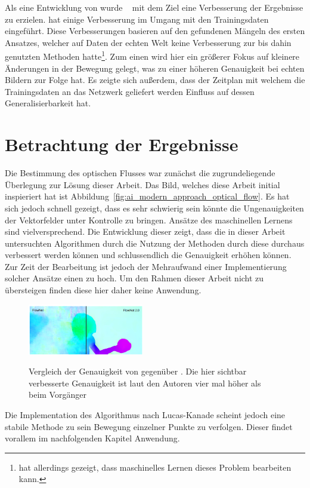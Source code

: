 Als eine Entwicklung von  wurde ~\cite{Ilg2016} mit dem Ziel eine Verbesserung der Ergebnisse zu erzielen.
 hat einige Verbesserung im Umgang mit den Trainingsdaten eingeführt.
Diese Verbesserungen basieren auf den gefundenen Mängeln des ersten Ansatzes, welcher auf Daten der echten Welt keine Verbesserung zur bis dahin genutzten Methoden hatte\footnote{ hat allerdings gezeigt, dass maschinelles Lernen dieses Problem bearbeiten kann.}.
Zum einen wird hier ein größerer Fokus auf kleinere Änderungen in der Bewegung gelegt, was zu einer höheren Genauigkeit bei echten Bildern zur Folge hat.
Es zeigte sich außerdem, dass der Zeitplan mit welchem die Trainingsdaten an das Netzwerk geliefert werden Einfluss auf dessen Generalisierbarkeit hat.

\section{Betrachtung der Ergebnisse}

Die Bestimmung des optischen Flusses war zunächst die zugrundeliegende Überlegung zur Lösung dieser Arbeit.
Das Bild, welches diese Arbeit initial inspieriert hat ist Abbildung~\ref{fig:ai_modern_approach_optical_flow}.
Es hat sich jedoch schnell gezeigt, dass es sehr schwierig sein könnte die Ungenauigkeiten der Vektorfelder unter Kontrolle zu bringen.
Ansätze des maschinellen Lernens sind vielversprechend.
Die Entwicklung dieser zeigt, dass die in dieser Arbeit untersuchten Algorithmen durch die Nutzung der Methoden durch diese durchaus verbessert werden können und schlussendlich die Genauigkeit erhöhen können.
Zur Zeit der Bearbeitung ist jedoch der Mehraufwand einer Implementierung solcher Ansätze einen zu hoch.
Um den Rahmen dieser Arbeit nicht zu übersteigen finden diese hier daher keine Anwendung.

\begin{figure}
    \centering
    \includegraphics[width=0.45\textwidth]{gfx/flownet_vs_flownet2.png}
    \label{fig:flownet_vs_flownet2}
    \caption[Vergleich  zu ]{Vergleich der Genauigkeit von  gegenüber . Die hier sichtbar verbesserte Genauigkeit ist laut den Autoren vier mal höher als beim Vorgänger~\cite{Ilg2016}}
\end{figure}

Die Implementation des Algorithmus nach Lucas-Kanade scheint jedoch eine stabile Methode zu sein Bewegung einzelner Punkte zu verfolgen.
Dieser findet vorallem im nachfolgenden Kapitel Anwendung.
